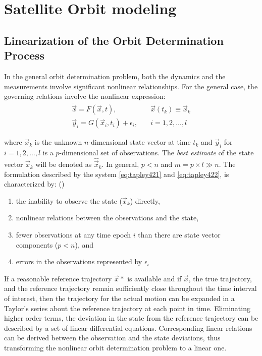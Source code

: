 \chapter{Satellite Orbit modeling}
\label{ch:satellite-orbit-modeling}

\section{Linearization of the Orbit Determination Process}
In the general orbit determination problem, both the dynamics and the measurements 
involve significant nonlinear relationships. For the general case, the governing 
relations involve the nonlinear expression:
\begin{align}
  \label{eq:tapley421}
  \dot{\vec{x}} = F( \vec{x}, t )                 , & \quad \vec{x}(t_k ) \equiv \vec{x}_k \\
  \label{eq:tapley422}
  \vec{y}_i = G( \vec{x}_i , t_i ) + {\epsilon}_i , & \quad  i=1,2,\ldots ,l
\end{align}

where \(\vec{x}_k\) is the unknown \(n\)-dimensional state vector at time \(t_k\) and 
\(\vec{y}_i\) for \(i=1,2,\ldots ,l\) is a \(p\)-dimensional set of observations. The 
\emph{best estimate} of the state vector \(\vec{x}_k\) will be denoted as \(\hat{\vec{x}}_k\). 
In general, \(p<n\) and \( m = p \times l \gg n \). The formulation described by the 
system \ref{eq:tapley421} and \ref{eq:tapley422}, is characterized by: (\cite{tapley})
\begin{enumerate}
  \item the inability to observe the state (\(\vec{x}_k\)) directly,
  \item nonlinear relations between the observations and the state, 
  \item fewer observations at any time epoch \(i\) than there are state vector 
  components (\(p<n\)), and 
  \item errors in the observations represented by \({\epsilon}_i\)
\end{enumerate}

If a reasonable reference trajectory \(\vec{x}*\) is available and if 
\(\vec{x}\), the true trajectory, and the reference trajectory remain sufficiently 
close throughout the time interval of interest, then the trajectory for the actual 
motion can be expanded in a Taylor’s series about the reference trajectory at 
each point in time. Eliminating higher order terms, the deviation in the state
from the reference trajectory can be described by a set of linear differential 
equations. Corresponding linear relations can be derived between the observation 
and the state deviations, thus transforming the nonlinear orbit determination problem 
to a linear one.

